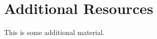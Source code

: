 \chapter{Additional Resources}
\label{sec:additional-resources}

This is some additional material.

